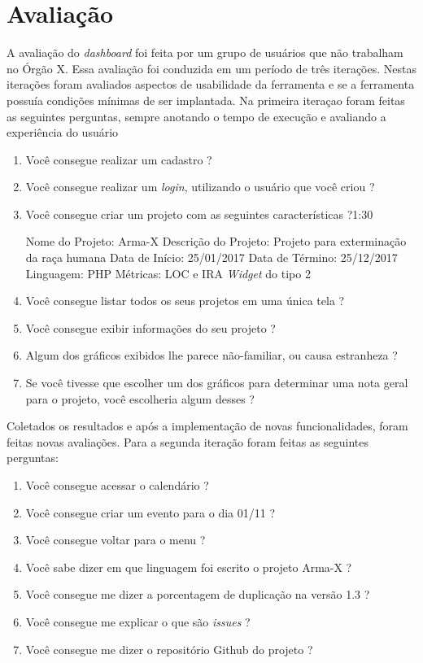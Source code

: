 \section{Avaliação}

A avaliação do \textit{dashboard} foi feita por um grupo de usuários que não trabalham no Órgão X. Essa avaliação foi conduzida em um período de três iterações. Nestas iterações foram avaliados aspectos de usabilidade da ferramenta e se a ferramenta possuía condições mínimas de ser implantada. Na primeira iteraçao foram feitas as seguintes perguntas, sempre anotando o tempo de execução e avaliando a experiência do usuário
\begin{enumerate}
\item Você consegue realizar um cadastro ?
\item Você consegue realizar um \textit{login}, utilizando o usuário que você criou ?
\item Você consegue criar um projeto com as seguintes características ?1:30

Nome do Projeto: Arma-X
Descrição do Projeto: Projeto para exterminação da raça humana
Data de Início: 25/01/2017
Data de Término: 25/12/2017
Linguagem: PHP
Métricas: LOC e IRA
\textit{Widget} do tipo 2

\item Você consegue listar todos os seus projetos em uma única tela ?
\item Você consegue exibir informações do seu projeto ?
\item Algum dos gráficos exibidos lhe parece não-familiar, ou causa estranheza ?
\item Se você tivesse que escolher um dos gráficos para determinar uma nota geral para o projeto, você escolheria algum desses ?
\end{enumerate}

Coletados os resultados e após a implementação de novas funcionalidades, foram feitas novas avaliações. Para a segunda iteração foram feitas as seguintes perguntas: 

\begin{enumerate}
\item Você consegue acessar o calendário ?
\item Você consegue criar um evento para o dia 01/11 ?
\item Você consegue voltar para o menu ?
\item Você sabe dizer em que linguagem foi escrito o projeto Arma-X ?
\item Você consegue me dizer a porcentagem de duplicação na versão 1.3 ? 
\item Você consegue me explicar o que são \textit{issues} ?
\item  Você consegue me dizer o repositório Github do projeto ?
\end{enumerate}

